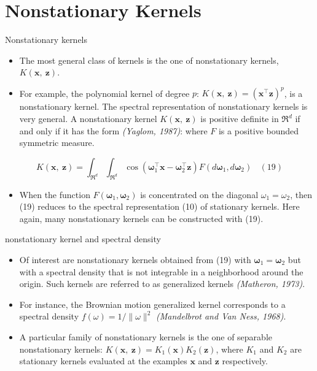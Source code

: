 \documentclass[
  ignorenonframetext,
]{beamer}
\providecommand{\tightlist}{%
  \setlength{\itemsep}{0pt}\setlength{\parskip}{0pt}}
\begin{document}
\hypertarget{nonstationary-kernels}{%
\section{Nonstationary Kernels}\label{nonstationary-kernels}}

\begin{frame}{Nonstationary kernels}
\protect\hypertarget{nonstationary-kernels-1}{}
\begin{itemize}
\item
  The most general class of kernels is the one of nonstationary kernels,
  \(K(\pmb x,\ \pmb z)\).
\item
  For example, the polynomial kernel of degree \(p\):
  \(K(\pmb x,\ \pmb z) = (\pmb x^{\top}\pmb z)^p\), is a nonstationary
  kernel. The spectral representation of nonstationary kernels is very
  general. A nonstationary kernel \(K(\pmb x,\ \pmb z)\) is positive
  definite in \(\mathfrak R^d\) if and only if it has the form
  \emph{(Yaglom, 1987)}: where \(F\) is a positive bounded symmetric
  measure.
\end{itemize}

\[
K(\pmb x,\ \pmb z) = \int_{\mathfrak R^d} \int_{\mathfrak R^d} \cos(\pmb\omega_1^{\top} \pmb x-\pmb\omega_2^{\top} \pmb z)F (d\pmb\omega_1, d\pmb\omega_2)\ \ \ \ (19)
\]

\begin{itemize}
\tightlist
\item
  When the function \(F(\pmb \omega_1, \pmb\omega_2)\) is concentrated
  on the diagonal \(\omega_1 = \omega_2\), then (19) reduces to the
  spectral representation (10) of stationary kernels. Here again, many
  nonstationary kernels can be constructed with (19).
\end{itemize}
\end{frame}

\begin{frame}{nonstationary kernel and spectral density}
\protect\hypertarget{nonstationary-kernel-and-spectral-density}{}
\begin{itemize}
\item
  Of interest are nonstationary kernels obtained from (19) with
  \(\pmb \omega_1 = \pmb \omega_2\) but with a spectral density that is
  not integrable in a neighborhood around the origin. Such kernels are
  referred to as generalized kernels \emph{(Matheron, 1973)}.
\item
  For instance, the Brownian motion generalized kernel corresponds to a
  spectral density \(f(\omega) = 1/\|\omega\|^2\) \emph{(Mandelbrot and
  Van Ness, 1968)}.
\item
  A particular family of nonstationary kernels is the one of separable
  nonstationary kernels:
  \(K(\pmb x,\ \pmb z) = K_1(\pmb x)K_2(\pmb z)\), where \(K_1\) and
  \(K_2\) are stationary kernels evaluated at the examples \(\pmb x\)
  and \(\pmb z\) respectively.
\end{itemize}
\end{frame}
\end{document}
